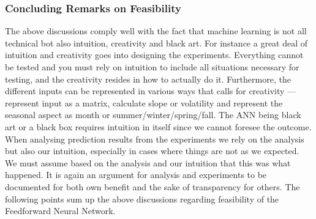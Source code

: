 \subsubsection{Concluding Remarks on Feasibility}
The above discussions comply well with the fact that machine learning is not all technical bot also intuition, creativity and black art\cite{18}. For instance a great deal of intuition and creativity goes into designing the experiments. Everything cannot be tested and you must rely on intuition to include all situations necessary for testing, and the creativity resides in how to actually do it. Furthermore, the different inputs can be represented in various ways that calls for creativity --- represent input as a matrix, calculate slope or volatility and represent the seasonal aspect as month or summer/winter/spring/fall. The ANN being black art or a black box requires intuition in itself since we cannot foresee the outcome. When analysing prediction results from the experiments we rely on the analysis but also our intuition, especially in cases where things are not as we expected. We must assume based on the analysis and our intuition that this was what happened. It is again an argument for analysis and experiments to be documented for both own benefit and the sake of transparency for others. The following points sum up the above discussions regarding feasibility of the Feedforward Neural Network.

